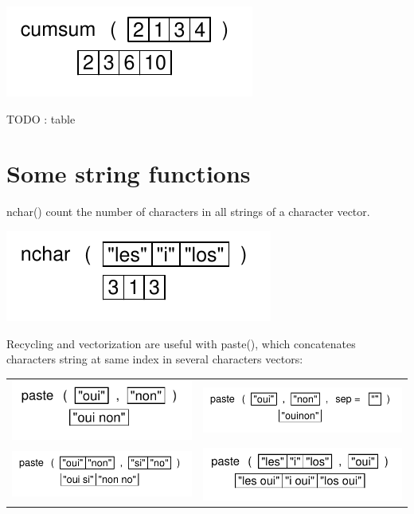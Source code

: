 \documentclass[pdflatex]{article}
\begin{document}
\includegraphics{cumsum}

TODO : table

\section{Some string functions}

nchar() count the number of characters in all strings of a character vector.

\includegraphics{nchar}

Recycling and vectorization are useful with paste(), which concatenates characters string at same index in several characters vectors:

\begin{tabular}{cc}
\includegraphics{paste} & \includegraphics{paste2}\\
\includegraphics{paste3} & \includegraphics{paste4}\\
\end{tabular}
\end{document}
